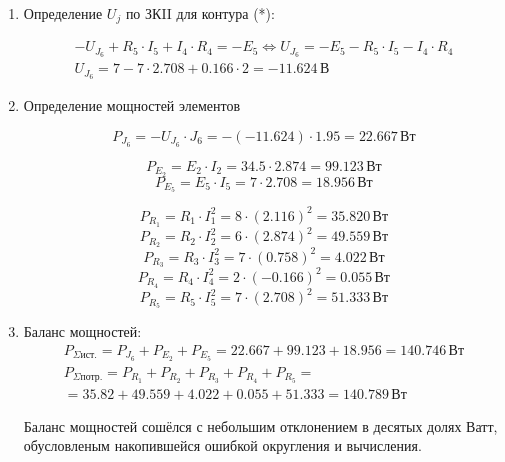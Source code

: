 \begin{enumerate}
	\item Определение $U_j$ по ЗКII для контура (*):
	      
	      \[
		      \begin{gathered}
			      -U_{J_6} + R_5 \cdot I_5 + I_4 \cdot R_4 = -E_5
			      \Leftrightarrow U_{J_6} = -E_5 - R_5 \cdot I_5 - I_4 \cdot R_4 \\
			      U_{J_6} = 7 - 7 \cdot 2.708 + 0.166 \cdot 2 = -11.624 \, \text{В}

		      \end{gathered}
	      \]

	\item Определение мощностей элементов

	      \[
		      P_{J_6} = -U_{J_6} \cdot J_6 = -(-11.624) \cdot 1.95 = 22.667 \, \text{Вт}
	      \]

	      \[
		      P_{E_2} = E_2 \cdot I_2 = 34.5 \cdot 2.874 = 99.123 \, \text{Вт}
	      \]
	      \[
		      P_{E_5} = E_5 \cdot I_5 = 7 \cdot 2.708 = 18.956 \, \text{Вт}
	      \]

	      \[
		      P_{R_1} = R_1 \cdot I_1^2 = 8 \cdot (2.116)^2 = 35.820 \, \text{Вт}
	      \]
	      \[
		      P_{R_2} = R_2 \cdot I_2^2 = 6 \cdot (2.874)^2 = 49.559 \, \text{Вт}
	      \]
	      \[
		      P_{R_3} = R_3 \cdot I_3^2 = 7 \cdot (0.758)^2 = 4.022 \, \text{Вт}
	      \]
	      \[
		      P_{R_4} = R_4 \cdot I_4^2 = 2 \cdot (-0.166)^2 = 0.055 \, \text{Вт}
	      \]
	      \[
		      P_{R_5} = R_5 \cdot I_5^2 = 7 \cdot (2.708)^2 = 51.333 \, \text{Вт}
	      \]

	\item Баланс мощностей:
	      \[
		      \begin{gathered}
			      P_{\Sigma \text{ист.}} = P_{J_6} + P_{E_2} + P_{E_5} = 22.667 + 99.123 + 18.956  = 140.746 \, \text{Вт} \\
			      P_{\Sigma \text{потр.}} = P_{R_1} + P_{R_2} + P_{R_3} + P_{R_4} + P_{R_5} = \\
			      = 35.82 + 49.559 + 4.022 + 0.055 + 51.333 = 140.789 \, \text{Вт}
		      \end{gathered}
	      \]

	      Баланс мощностей сошёлся с небольшим отклонением в десятых долях Ватт, обусловленым накопившейся ошибкой округления и вычисления.

\end{enumerate}

